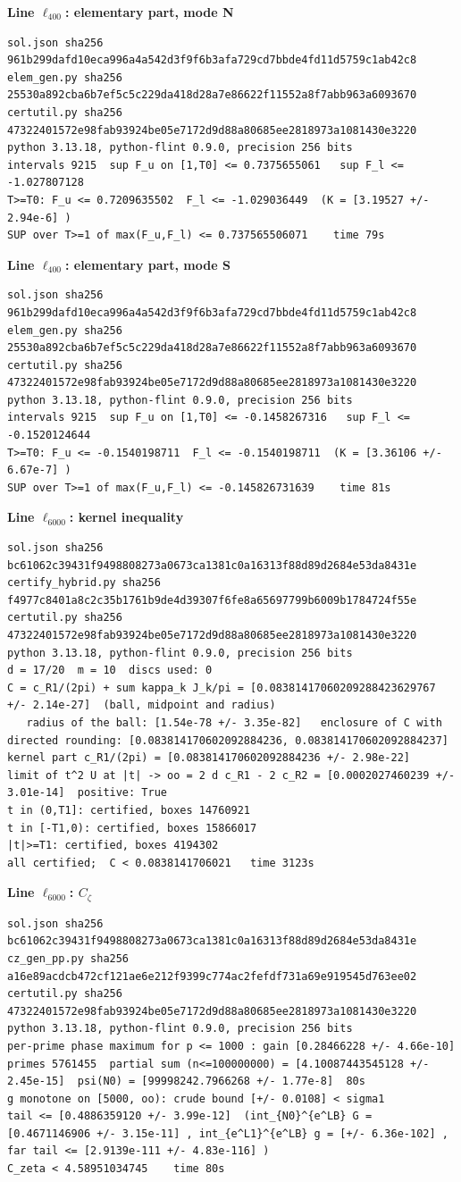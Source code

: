 \documentclass[11pt,reqno]{amsart}
\numberwithin{equation}{section}
\theoremstyle{definition}
\theoremstyle{remark}
\newcommand{\appsub}[1]{\par\medskip\noindent\textbf{#1}\par\nobreak\smallskip}
\begin{document}
\appsub{Line $\ell_{400}$: elementary part, mode N}
\begin{lstlisting}
sol.json sha256 961b299dafd10eca996a4a542d3f9f6b3afa729cd7bbde4fd11d5759c1ab42c8
elem_gen.py sha256 25530a892cba6b7ef5c5c229da418d28a7e86622f11552a8f7abb963a6093670
certutil.py sha256 47322401572e98fab93924be05e7172d9d88a80685ee2818973a1081430e3220
python 3.13.18, python-flint 0.9.0, precision 256 bits
intervals 9215  sup F_u on [1,T0] <= 0.7375655061   sup F_l <= -1.027807128
T>=T0: F_u <= 0.7209635502  F_l <= -1.029036449  (K = [3.19527 +/- 2.94e-6] )
SUP over T>=1 of max(F_u,F_l) <= 0.737565506071    time 79s
\end{lstlisting}
\appsub{Line $\ell_{400}$: elementary part, mode S}
\begin{lstlisting}
sol.json sha256 961b299dafd10eca996a4a542d3f9f6b3afa729cd7bbde4fd11d5759c1ab42c8
elem_gen.py sha256 25530a892cba6b7ef5c5c229da418d28a7e86622f11552a8f7abb963a6093670
certutil.py sha256 47322401572e98fab93924be05e7172d9d88a80685ee2818973a1081430e3220
python 3.13.18, python-flint 0.9.0, precision 256 bits
intervals 9215  sup F_u on [1,T0] <= -0.1458267316   sup F_l <= -0.1520124644
T>=T0: F_u <= -0.1540198711  F_l <= -0.1540198711  (K = [3.36106 +/- 6.67e-7] )
SUP over T>=1 of max(F_u,F_l) <= -0.145826731639    time 81s
\end{lstlisting}
\appsub{Line $\ell_{6000}$: kernel inequality}
\begin{lstlisting}
sol.json sha256 bc61062c39431f9498808273a0673ca1381c0a16313f88d89d2684e53da8431e
certify_hybrid.py sha256 f4977c8401a8c2c35b1761b9de4d39307f6fe8a65697799b6009b1784724f55e
certutil.py sha256 47322401572e98fab93924be05e7172d9d88a80685ee2818973a1081430e3220
python 3.13.18, python-flint 0.9.0, precision 256 bits
d = 17/20  m = 10  discs used: 0 
C = c_R1/(2pi) + sum kappa_k J_k/pi = [0.08381417060209288423629767 +/- 2.14e-27]  (ball, midpoint and radius)
   radius of the ball: [1.54e-78 +/- 3.35e-82]   enclosure of C with directed rounding: [0.083814170602092884236, 0.083814170602092884237]
kernel part c_R1/(2pi) = [0.083814170602092884236 +/- 2.98e-22]
limit of t^2 U at |t| -> oo = 2 d c_R1 - 2 c_R2 = [0.0002027460239 +/- 3.01e-14]  positive: True
t in (0,T1]: certified, boxes 14760921
t in [-T1,0): certified, boxes 15866017
|t|>=T1: certified, boxes 4194302
all certified;  C < 0.0838141706021   time 3123s
\end{lstlisting}
\appsub{Line $\ell_{6000}$: $C_\zeta$}
\begin{lstlisting}
sol.json sha256 bc61062c39431f9498808273a0673ca1381c0a16313f88d89d2684e53da8431e
cz_gen_pp.py sha256 a16e89acdcb472cf121ae6e212f9399c774ac2fefdf731a69e919545d763ee02
certutil.py sha256 47322401572e98fab93924be05e7172d9d88a80685ee2818973a1081430e3220
python 3.13.18, python-flint 0.9.0, precision 256 bits
per-prime phase maximum for p <= 1000 : gain [0.28466228 +/- 4.66e-10]
primes 5761455  partial sum (n<=100000000) = [4.10087443545128 +/- 2.45e-15]  psi(N0) = [99998242.7966268 +/- 1.77e-8]  80s
g monotone on [5000, oo): crude bound [+/- 0.0108] < sigma1
tail <= [0.4886359120 +/- 3.99e-12]  (int_{N0}^{e^LB} G = [0.4671146906 +/- 3.15e-11] , int_{e^L1}^{e^LB} g = [+/- 6.36e-102] , far tail <= [2.9139e-111 +/- 4.83e-116] )
C_zeta < 4.58951034745    time 80s
\end{lstlisting}
\end{document}
